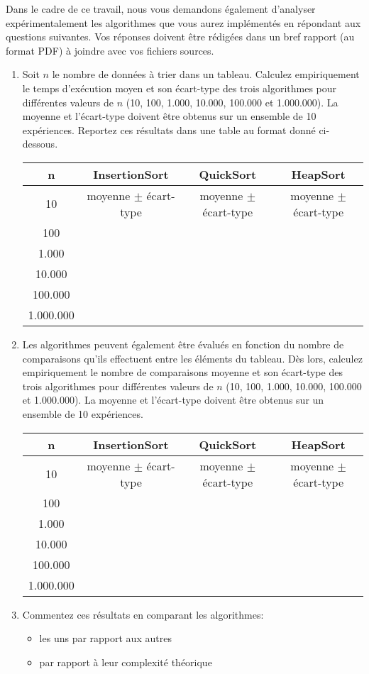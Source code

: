 \documentclass[a4paper,10pt]{article}
\begin{document}
Dans le cadre de ce travail, nous vous demandons également d'analyser
expérimentalement les algorithmes que vous aurez implémentés en répondant aux
questions suivantes. Vos réponses doivent être rédigées dans un bref rapport (au
format PDF) à joindre avec vos fichiers sources.

\begin{enumerate}
\item Soit $n$ le nombre de données à trier dans un tableau. Calculez
empiriquement le temps d'exécution moyen et son écart-type des trois
algorithmes pour différentes valeurs de $n$ (10, 100, 1.000, 10.000,
100.000 et 1.000.000). La moyenne et l'écart-type doivent être obtenus
sur un ensemble de 10 expériences. Reportez ces résultats dans une table au format donné ci-dessous.

\begin{center}
\begin{tabular}{cccc}
	\hline
	n & InsertionSort & QuickSort & HeapSort \\
	\hline
	10 & moyenne $\pm$ écart-type & moyenne $\pm$ écart-type & moyenne $\pm$ écart-type\\
	100 & & &\\
	1.000 & & &\\
	10.000 & & &\\
	100.000 & & &\\
	1.000.000 & & &\\
\end{tabular}
\end{center}
\item Les algorithmes peuvent également être évalués en fonction du nombre de
comparaisons qu'ils effectuent entre les éléments du tableau. Dès lors, calculez
empiriquement le nombre de comparaisons moyenne et son écart-type des trois
algorithmes pour différentes valeurs de $n$ (10, 100, 1.000, 10.000, 100.000 et
1.000.000). La moyenne et l'écart-type doivent être obtenus sur un ensemble de
10 expériences.
\begin{center}
\begin{tabular}{cccc}
	\hline
	n & InsertionSort & QuickSort & HeapSort \\
	\hline
	10 & moyenne $\pm$ écart-type & moyenne $\pm$ écart-type & moyenne $\pm$ écart-type\\
	100 & & &\\
	1.000 & & &\\
	10.000 & & &\\
	100.000 & & &\\
	1.000.000 & & &\\
\end{tabular}
\end{center}
\item Commentez ces résultats en comparant les algorithmes:
\begin{itemize}
\item les uns par rapport aux autres
\item par rapport à leur complexité théorique
\end{itemize}
\end{enumerate}
\end{document}
